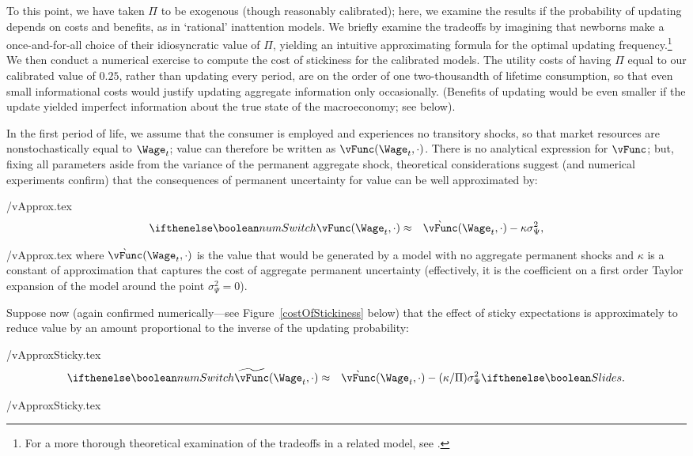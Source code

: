 \documentclass[titlepage]{\econtex}\newcommand{\texname}{cAndCwithStickyE}
\begin{document}
To this point, we have taken $\Pi$ to be exogenous (though reasonably calibrated); here, we examine the results if the probability of updating depends on costs and benefits, as in `rational' inattention models.  We briefly examine the tradeoffs by imagining that newborns make a once-and-for-all choice of their idiosyncratic value of $\Pi$, yielding an intuitive approximating formula for the optimal updating frequency.\footnote{For a more thorough theoretical examination of the tradeoffs in a related model, see \cite{reis:inattentive}.}  We then conduct a numerical exercise to compute the cost of stickiness for the calibrated models.  The utility costs of having $\Pi$ equal to our calibrated value of $0.25$, rather than updating every period, are on the order of one two-thousandth of lifetime consumption, so that even small informational costs would justify updating aggregate information only occasionally.  (Benefits of updating would be even smaller if the update yielded imperfect information about the true state of the macroeconomy; see below).

In the first period of life, we assume that the consumer is employed and experiences no transitory shocks, so that market resources are nonstochastically equal to $\Wage_t$; value can therefore be written as $\vFunc(\Wage_t,\cdot)$.  There is no analytical expression for $\vFunc$; but, fixing all parameters aside from the variance of the permanent aggregate shock, theoretical considerations suggest (and numerical experiments confirm) that the consequences of permanent uncertainty for value can be well approximated by:
\begin{verbatimwrite}{\eq/vApprox.tex}
\begin{eqnarray}
\ifnumSw  \vFunc(\Wage_t,\cdot) & \approx & \grave{\vFunc}(\Wage_t,\cdot) - \kappa \sigma^{2}_{\Psi}, \label{eq:vApprox}
\end{eqnarray}
\end{verbatimwrite}
 {\eq/vApprox.tex} where $\grave{\vFunc}(\Wage_t,\cdot)$ is the value that would be generated by a model with no aggregate permanent shocks and $\kappa$ is a constant of approximation that captures the cost of aggregate permanent uncertainty (effectively, it is the coefficient on a first order Taylor expansion of the model around the point $\sigma_{\Psi}^{2}=0$).

Suppose now (again confirmed numerically---see Figure~\ref{costOfStickiness} below) that the effect of sticky expectations is approximately to reduce value by an amount proportional to the inverse of the updating probability:
\begin{verbatimwrite}{\eq/vApproxSticky.tex}
\begin{eqnarray}
  \label{eq:vBar}
\ifnumSw  \perc{\vFunc}(\Wage_t,\cdot) & \approx & \grave{\vFunc}(\Wage_t,\cdot)-(\kappa/\Pi)\sigma^{2}_{\Psi} \label{eq:vApproxSticky}
\ifslides{}{.}
\end{eqnarray}
\end{verbatimwrite}
 \eq/vApproxSticky.tex
\end{document}
